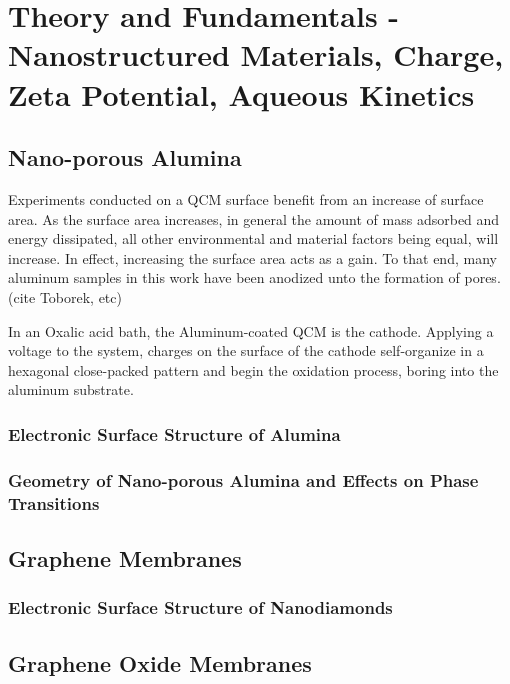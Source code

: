 \chapter{Theory and Fundamentals - Nanostructured Materials, Charge, Zeta Potential, Aqueous Kinetics}

\label{chap-three}

\section{Nano-porous Alumina}

Experiments conducted on a QCM surface benefit from an increase of surface area. As the surface area increases, in general the amount of mass adsorbed and energy dissipated, all other environmental and material factors being equal, will increase. In effect, increasing the surface area acts as a gain. To that end, many aluminum samples in this work have been anodized unto the formation of pores.(cite Toborek, etc)

In an Oxalic acid bath, the Aluminum-coated QCM is the cathode.  Applying a voltage to the system, charges on the surface of the cathode self-organize in a hexagonal close-packed pattern and begin the oxidation process, boring into the aluminum substrate.




\subsection{Electronic Surface Structure of Alumina}

\subsection{Geometry of Nano-porous Alumina and Effects on Phase Transitions}





\section{Graphene Membranes}

\subsection{Electronic Surface Structure of Nanodiamonds}






\section{Graphene Oxide Membranes}

